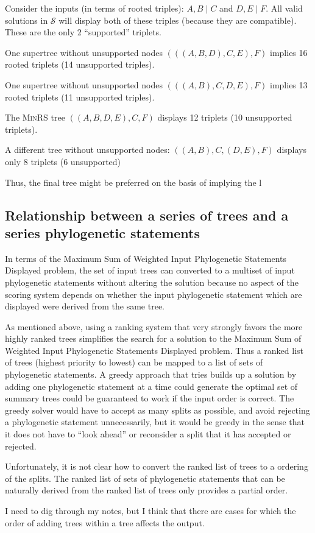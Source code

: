 \documentclass[11pt]{article}
\newcommand{\ps}{phylogenetic statement\xspace}
\newcommand{\pss}{phylogenetic statements\xspace}
\newcommand{\PSs}{Phylogenetic Statements\xspace}
\newcommand{\SWIPSD}{Sum of Weighted Input \PSs Displayed\xspace}
\newcommand{\MSWIPSD}{Maximum \SWIPSD \xspace}
\begin{document}
Consider the inputs (in terms of rooted triples): $A,B\mid C$ and $D,E\mid F$.
All valid solutions in $\mathcal{S}$ will display both of these triples (because they are compatible).
These are the only 2 ``supported'' triplets.

One supertree without unsupported nodes $(((A,B,D),C,E),F)$ 
implies 16 rooted triplets (14 unsupported triples).

One supertree without unsupported nodes $(((A,B),C,D,E),F)$ 
implies 13 rooted triplets (11 unsupported triples).

The \textsc{MinRS} tree $((A,B,D,E),C,F)$ displays 12 triplets (10 unsupported triplets).

A different tree without unsupported nodes: $((A,B),C,(D,E),F)$ displays only 8 triplets (6 unsupported)

Thus, the final tree might be preferred on the basis of implying the l

\subsection{Relationship between a series of trees and a series \pss}\label{orderPSsTheory}
In terms of the \MSWIPSD problem, the set of input trees can converted to a multiset of input \pss without 
    altering the solution because no aspect of the scoring system depends on whether the input \ps
    which are displayed were derived from the same tree.

As mentioned above, using a ranking system that very strongly favors the more highly ranked trees
    simplifies the search for a solution to the \MSWIPSD problem.
Thus a ranked list of trees (highest priority to lowest) can be mapped to a list of sets of \pss.
A greedy approach that tries builds up a solution by adding one \ps at a time could generate the optimal
    set of summary trees could be guaranteed to work if the input order is correct.
The greedy solver would have to accept as many splits as possible, and avoid rejecting a \ps unnecessarily,
    but it would be greedy in the sense that it does not have to ``look ahead'' or reconsider a split
    that it has accepted or rejected.

Unfortunately, it is not clear how to convert the ranked list of trees to a ordering of the splits.
The ranked list of sets of \pss that can be naturally derived from the ranked list of trees only provides
    a partial order.

I need to dig through my notes, but I think that there are cases for which the order of adding trees within
    a tree affects the output.
\end{document}

